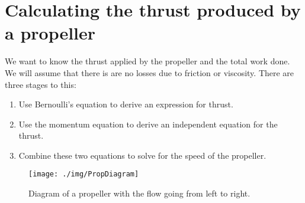 \section{Calculating the thrust produced by \\ a propeller}
We want to know the thrust applied by the propeller and the total work done. We will assume that there is are no losses due to friction or viscosity. There are three stages to this:
\begin{enumerate}[noitemsep]
  \item Use Bernoulli's equation to derive an expression for thrust.
  \item Use the momentum equation to derive an independent equation for the thrust.
  \item Combine these two equations to solve for the speed of the propeller.
\end{enumerate}
\begin{figure}
  \centering
  \texttt{[image: ./img/PropDiagram]}
  \caption{Diagram of a propeller with the flow going from left to right.}
\end{figure}
